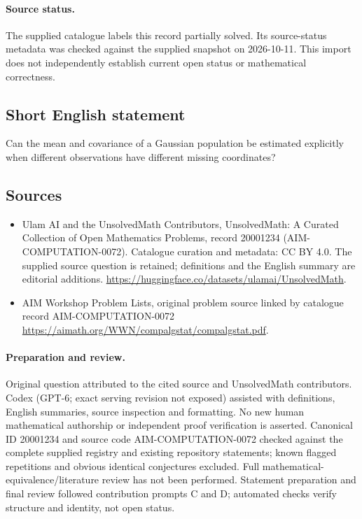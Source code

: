 \documentclass[11pt]{article}
\begin{document}
\paragraph{Source status.}
The supplied catalogue labels this record partially solved. Its source-status metadata was checked against the supplied snapshot on 2026-10-11. This import does not independently establish current open status or mathematical correctness.
\subsection{Short English statement}
Can the mean and covariance of a Gaussian population be estimated explicitly when different observations have different missing coordinates?
\subsection{Sources}
\begin{itemize}
\item[\hypertarget{source:20001234:1}{S1}] Ulam AI and the UnsolvedMath Contributors, UnsolvedMath: A Curated Collection of Open Mathematics Problems, record 20001234 (AIM-COMPUTATION-0072). Catalogue curation and metadata: CC BY 4.0. The supplied source question is retained; definitions and the English summary are editorial additions.
\url{https://huggingface.co/datasets/ulamai/UnsolvedMath}.
\item[\hypertarget{source:20001234:2}{S2}] AIM Workshop Problem Lists, original problem source linked by catalogue record AIM-COMPUTATION-0072
\url{https://aimath.org/WWN/compalgstat/compalgstat.pdf}.
\end{itemize}
\paragraph{Preparation and review.}
Original question attributed to the cited source and UnsolvedMath contributors. Codex (GPT-6; exact serving revision not exposed) assisted with definitions, English summaries, source inspection and formatting. No new human mathematical authorship or independent proof verification is asserted. Canonical ID 20001234 and source code AIM-COMPUTATION-0072 checked against the complete supplied registry and existing repository statements; known flagged repetitions and obvious identical conjectures excluded. Full mathematical-equivalence/literature review has not been performed. Statement preparation and final review followed contribution prompts C and D; automated checks verify structure and identity, not open status.
\label{end:20001234}
\end{document}
